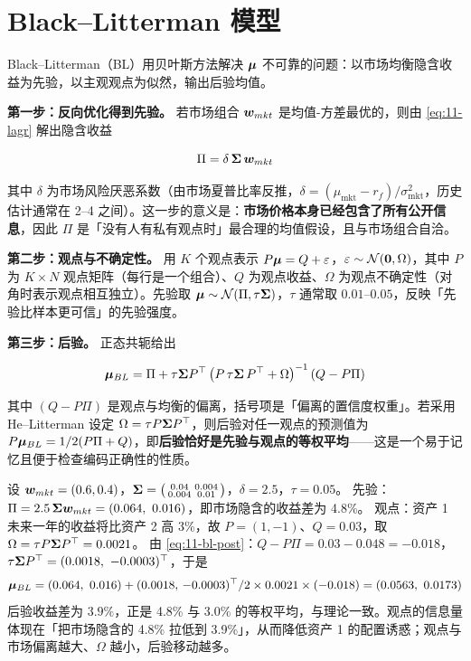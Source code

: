 \section{Black--Litterman 模型}

Black--Litterman（BL）用贝叶斯方法解决 $\bm{\mu}$ 不可靠的问题：以市场均衡隐含收益为先验，以主观观点为似然，输出后验均值。

\textbf{第一步：反向优化得到先验。} 若市场组合 $\bm{w}_{mkt}$ 是均值-方差最优的，则由 \cref{eq:11-lagr} 解出隐含收益

\begin{equation}\label{eq:11-bl-prior}
  \Pi = \delta\,\bm{\Sigma}\,\bm{w}_{mkt}
\end{equation}

其中 $\delta$ 为市场风险厌恶系数（由市场夏普比率反推，$\delta = (\mu_{\text{mkt}} - r_f)/\sigma_{\text{mkt}}^{2}$，历史估计通常在 2--4 之间）。这一步的意义是：\textbf{市场价格本身已经包含了所有公开信息}，因此 $\Pi$ 是「没有人有私有观点时」最合理的均值假设，且与市场组合自洽。

\textbf{第二步：观点与不确定性。} 用 $K$ 个观点表示 $P\bm{\mu} = Q + \varepsilon$，$\varepsilon \sim \mathcal{N}(\mathbf{0}, \Omega)$，其中 $P$ 为 $K\times N$ 观点矩阵（每行是一个组合）、$Q$ 为观点收益、$\Omega$ 为观点不确定性（对角时表示观点相互独立）。先验取 $\bm{\mu} \sim \mathcal{N}(\Pi, \tau\bm{\Sigma})$，$\tau$ 通常取 $0.01$--$0.05$，反映「先验比样本更可信」的先验强度。

\textbf{第三步：后验。} 正态共轭给出

\begin{equation}\label{eq:11-bl-post}
  \bm{\mu}_{BL} = \Pi + \tau\bm{\Sigma} P^{\top}\left(P\,\tau\bm{\Sigma}\,P^{\top} + \Omega\right)^{-1}\left(Q - P\Pi\right)
\end{equation}

其中 $(Q - P\Pi)$ 是观点与均衡的偏离，括号项是「偏离的置信度权重」。若采用 He--Litterman 设定 $\Omega = \tau P\bm{\Sigma} P^{\top}$，则后验对任一观点的预测值为 $P\bm{\mu}_{BL} = 1/2(P\Pi + Q)$，即\textbf{后验恰好是先验与观点的等权平均}——这是一个易于记忆且便于检查编码正确性的性质。

\begin{example}\label{ex:11-bl}
设 $\bm{w}_{mkt} = (0.6, 0.4)$，$\bm{\Sigma} = \bigl(\begin{smallmatrix} 0.04 & 0.004 \\ 0.004 & 0.01 \end{smallmatrix}\bigr)$，$\delta = 2.5$，$\tau = 0.05$。
先验：$\Pi = 2.5\,\bm{\Sigma}\bm{w}_{mkt} = (0.064,\ 0.016)$，即市场隐含的收益差为 4.8\%。
观点：资产 1 未来一年的收益将比资产 2 高 3\%，故 $P = (1,-1)$、$Q = 0.03$，取 $\Omega = \tau P\bm{\Sigma} P^{\top} = 0.0021$。
由 \cref{eq:11-bl-post}：$Q - P\Pi = 0.03 - 0.048 = -0.018$，$\tau\Sigmamat P^{\top} = (0.0018,\ -0.0003)^{\top}$，于是
\[
  \bm{\mu}_{BL} = (0.064,\ 0.016) + (0.0018,\,-0.0003)^{\top}/2\times 0.0021\times(-0.018)
  = (0.0563,\ 0.0173)
\]
后验收益差为 $3.9\%$，正是 4.8\% 与 3.0\% 的等权平均，与理论一致。观点的信息量体现在「把市场隐含的 4.8\% 拉低到 3.9\%」，从而降低资产 1 的配置诱惑；观点与市场偏离越大、$\Omega$ 越小，后验移动越多。
\end{example}

